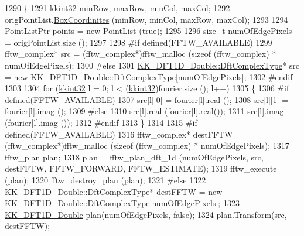 \begin{DoxyCode}
1290 \{
1291   \hyperlink{namespace_k_k_b_a8fa4952cc84fda1de4bec1fbdd8d5b1b}{kkint32}  minRow, maxRow, minCol, maxCol;
1292   origPointList.\hyperlink{class_k_k_b_1_1_point_list_a88e04c04e513be256b1528e1f56db795}{BoxCoordinites} (minRow, minCol, maxRow, maxCol);
1293 
1294   \hyperlink{class_k_k_b_1_1_point_list}{PointListPtr}  points = \textcolor{keyword}{new} \hyperlink{class_k_k_b_1_1_point_list}{PointList} (\textcolor{keyword}{true});
1295 
1296   \textcolor{keywordtype}{size\_t}  numOfEdgePixels = origPointList.size ();
1297 
1298 \textcolor{preprocessor}{  #if  defined(FFTW\_AVAILABLE)}
1299      fftw\_complex*  src = (fftw\_complex*)fftw\_malloc (\textcolor{keyword}{sizeof} (fftw\_complex) * numOfEdgePixels);
1300 \textcolor{preprocessor}{  #else}
1301      \hyperlink{class_k_k_b_1_1_k_k___d_f_t1_d_a4cbc827157dd30ddec2d3753e552a827}{KK\_DFT1D\_Double::DftComplexType}*  src = \textcolor{keyword}{new} 
      \hyperlink{class_k_k_b_1_1_k_k___d_f_t1_d_a4cbc827157dd30ddec2d3753e552a827}{KK\_DFT1D\_Double::DftComplexType}[numOfEdgePixels];
1302 \textcolor{preprocessor}{  #endif}
1303 
1304   \textcolor{keywordflow}{for}  (\hyperlink{namespace_k_k_b_a8fa4952cc84fda1de4bec1fbdd8d5b1b}{kkint32}  l = 0;  l < (\hyperlink{namespace_k_k_b_a8fa4952cc84fda1de4bec1fbdd8d5b1b}{kkint32})fourier.size ();  l++)
1305   \{
1306 \textcolor{preprocessor}{    #if  defined(FFTW\_AVAILABLE)}
1307     src[l][0] = fourier[l].real ();
1308     src[l][1] = fourier[l].imag ();
1309 \textcolor{preprocessor}{    #else}
1310     src[l].real (fourier[l].real());
1311     src[l].imag (fourier[l].imag ());
1312 \textcolor{preprocessor}{    #endif}
1313   \}
1314 
1315 \textcolor{preprocessor}{  #if  defined(FFTW\_AVAILABLE)}
1316     fftw\_complex*   destFFTW = (fftw\_complex*)fftw\_malloc (\textcolor{keyword}{sizeof} (fftw\_complex) * numOfEdgePixels);
1317     fftw\_plan       plan;
1318     plan = fftw\_plan\_dft\_1d (numOfEdgePixels, src, destFFTW, FFTW\_FORWARD, FFTW\_ESTIMATE);
1319     fftw\_execute (plan);
1320     fftw\_destroy\_plan (plan);  
1321 \textcolor{preprocessor}{  #else}
1322     \hyperlink{class_k_k_b_1_1_k_k___d_f_t1_d_a4cbc827157dd30ddec2d3753e552a827}{KK\_DFT1D\_Double::DftComplexType}*  destFFTW = \textcolor{keyword}{new} 
      \hyperlink{class_k_k_b_1_1_k_k___d_f_t1_d_a4cbc827157dd30ddec2d3753e552a827}{KK\_DFT1D\_Double::DftComplexType}[numOfEdgePixels];
1323     \hyperlink{class_k_k_b_1_1_k_k___d_f_t1_d}{KK\_DFT1D\_Double}  plan(numOfEdgePixels, \textcolor{keyword}{false});
1324     plan.Transform(src, destFFTW);

\end{DoxyCode}
